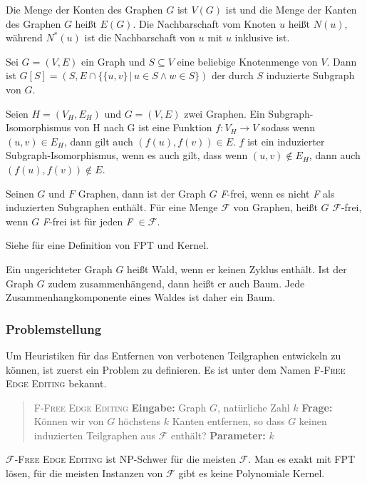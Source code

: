 \documentclass[12pt,a4paper,onecolumn,oneside,titlepage]{article}
\newcommand\cursive[1]{\ensuremath{\mathcal{#1}}}
\begin{document}
Die Menge der Konten des Graphen $G$ ist $V(G)$ ist und die Menge der Kanten des Graphen $G$ heißt $E(G)$. Die Nachbarschaft vom Knoten $u$ heißt $N(u)$,  während $N^{*}(u)$ ist die Nachbarschaft von $u$ mit $u$ inklusive ist.

Sei $G = (V,E)$ ein Graph und $S \subseteq V$ eine beliebige Knotenmenge von $V$. 
Dann ist $G[S] = (S, E \cap \{\{u,v\} \,|\, u \in S \land w \in S\})$ der durch $S$ induzierte Subgraph von $G$.

Seien $H = (V_H,E_H)$ und $G =(V,E)$ zwei Graphen. Ein Subgraph-Isomorphismus von H nach G ist eine Funktion $f : V_H \rightarrow V$ sodass wenn $(u,v) \in E_H $, dann gilt auch $(f(u),f(v)) \in E$. $f$ ist ein induzierter Subgraph-Isomorphismus, wenn es auch gilt, dass wenn $(u,v) \notin E_H$, dann auch $(f(u),f(v)) \notin E$.

Seinen $G$ und $F$ Graphen, dann ist der Graph $G$ \textit{F}-frei, wenn es nicht \textit{F} als induzierten Subgraphen enthält.
Für eine Menge \cursive{F} von Graphen, heißt $G$ \cursive{F}-frei, wenn $G$ \textit{F}-frei ist für jeden \textit{F} $\in \cursive{F}$.

Siehe \cite{Cai96} für eine Definition von FPT und Kernel.

Ein ungerichteter Graph $G$ heißt Wald, wenn er keinen Zyklus enthält. Ist der Graph $G$ zudem zusammenhängend, dann heißt er auch Baum. Jede Zusammenhangkomponente eines Waldes ist daher ein Baum.

\subsubsection{Problemstellung}
\label{sec:problem}
Um Heuristiken für das Entfernen von verbotenen Teilgraphen entwickeln zu können, ist zuerst ein Problem zu definieren. Es ist unter dem Namen \textsc{F-Free Edge Editing} bekannt.
\begin{quote}
  \textsc{F-Free Edge Editing}\newline
  \textbf{Eingabe:} Graph $G$, natürliche Zahl $k$\newline
  \textbf{Frage:} Können wir von $G$ höchstens $k$ Kanten entfernen, so dass $G$ keinen induzierten Teilgraphen aus \cursive{F} enthält?\newline
  \textbf{Parameter:} $k$
\end{quote}
\textsc{\cursive{F}-Free Edge Editing} ist NP-Schwer für die meisten \cursive{F}. Man es exakt mit FPT lösen\cite{Cai96}, für die meisten Instanzen von \cursive{F} gibt es keine Polynomiale Kernel.
\end{document}
